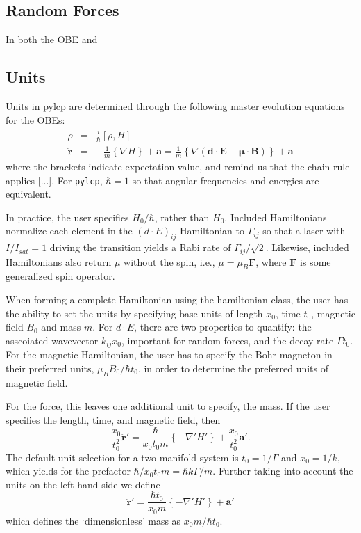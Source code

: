 \documentclass[final,5p,times,twocolumn]{elsarticle}
\newcounter{bla}
\begin{document}
\subsection{Random Forces}
In both the OBE and

\subsection{Units}
Units in pylcp are determined through the following master evolution equations
for the OBEs:
\begin{eqnarray}
    \dot{\rho} & = & \frac{i}{\hbar}[\rho, H] \\
    \ddot{\mathbf{r}} & = & -\frac{1}{m} \left\{\nabla H\right\} + \mathbf{a} = \frac{1}{m}\left\{\nabla (\mathbf{d} \cdot \mathbf{E} + \mathbf{\mu}\cdot \mathbf{B})\right\} + \mathbf{a}
\end{eqnarray}
where the brackets indicate expectation value, and remind us that the chain rule
applies [...].  For {\tt pylcp}, $\hbar=1$ so that angular frequencies and
energies are equivalent.

In practice, the user specifies $H_0/\hbar$, rather than $H_0$. Included
Hamiltonians normalize each element in the $(d\cdot E)_{ij}$ Hamiltonian
to $\Gamma_{ij}$ so that a laser with $I/I_{sat}=1$ driving the transition
yields a Rabi rate of $\Gamma_{ij}/\sqrt{2}$.  Likewise, included Hamiltonians
also return $\mu$ without the spin, i.e., $\mu = \mu_B \mathbf{F}$, where
$\mathbf{F}$ is some generalized spin operator.

When forming a complete Hamiltonian using the hamiltonian class, the user has
the ability to set the units by specifying base units of length $x_0$, time
$t_0$, magnetic field $B_0$ and mass $m$.  For $d\cdot E$, there are two properties
to quantify: the asscoiated wavevector $k_{ij}x_0$, important for random forces, 
and the decay rate $\Gamma t_0$.  For the magnetic Hamiltonian, the user has to 
specify the Bohr magneton in their preferred units, $\mu_B B_0/\hbar t_0$, in 
order to determine the preferred units of magnetic field.

For the force, this leaves one additional unit to specify, the mass.  If the
user specifies the length, time, and magnetic field, then
\begin{equation}
    \frac{x_0}{t_0^2} \ddot{\mathbf{r}}' = \frac{\hbar}{x_0 t_0 m}\left\{ -\nabla' H'\right\} + \frac{x_0}{t_0^2}\mathbf{a}'.
\end{equation}
The default unit selection for a two-manifold system is $t_0=1/\Gamma$ and $x_0=1/k$, which yields for the prefactor $\hbar/x_0 t_0 m = \hbar k \Gamma/m$.   Further taking into account the units on the left hand side we define
\begin{equation}
	\ddot{\mathbf{r}}' = \frac{\hbar t_0}{x_0 m}\left\{ -\nabla' H'\right\} + \mathbf{a}'
\end{equation}
which defines the `dimensionless' mass as $x_0 m/\hbar t_0$.
\end{document}
